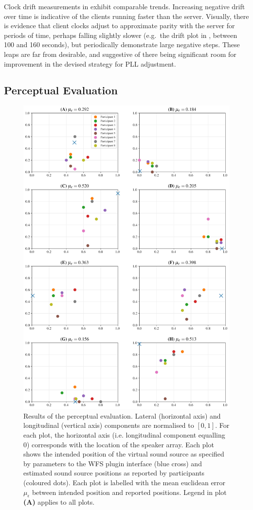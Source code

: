Clock drift measurements in  exhibit
comparable trends.
Increasing negative drift over time is indicative of the clients running faster
than the server.
Visually, there is evidence that client clocks adjust to approximate parity
with the server for periods of time, perhaps falling slightly slower (e.g.\
the drift plot in , between 100 and 160 seconds), but
periodically demonstrate large negative steps.
These leaps are far from desirable, and suggestive of there being significant
room for improvement in the devised strategy for PLL adjustment.


\subsection{Perceptual Evaluation}\label{subsec:perceptual-evaluation}

\begin{figure}[ht]
    \centering
    \includegraphics[width=.8\textwidth]{figures/subjective}
    \caption{
        Results of the perceptual evaluation.
        Lateral (horizontal axis) and longitudinal (vertical axis) components
        are normalised to $[0, 1]$.
        For each plot, the horizontal axis (i.e. longitudinal component
        equalling 0) corresponds with the location of the speaker array.
        Each plot shows the intended position of the virtual sound source as
        specified by parameters to the WFS plugin interface (blue cross) and
        estimated sound source positions as reported by participants (coloured
        dots).
        Each plot is labelled with the mean euclidean error $\mu_\epsilon$
        between intended position and reported positions.
        Legend in plot \textbf{(A)} applies to all plots.
    }
    \label{fig:perceptual}
\end{figure}

